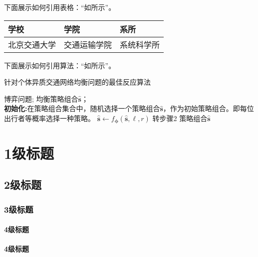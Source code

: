 下面展示如何引用表格：“如所示”。

\begin{bjtutable}
	\begin{tabularx}{\textwidth}{X<{\centering}X<{\centering}X<{\centering}}
		\toprule
		学校&学院&系所\\
		\midrule
		北京交通大学&交通运输学院&系统科学所\\
		\bottomrule
	\end{tabularx}
\end{bjtutable}

下面展示如何引用算法：“如所示”。

\begin{algorithm}[htbp] 
	\caption{针对个体异质交通网络均衡问题的最佳反应算法}
	\label{alg_ptn} 
	\begin{algorithmic}[1]
	 \Require
	 博弈问题; 
	 \Ensure 
	 均衡策略组合$\widehat{\bm{s}}$；\\
	 \textbf{初始化:}在策略组合集合中，随机选择一个策略组合$\widehat{\bm{s}}$，作为初始策略组合。即每位出行者等概率选择一种策略。
	 \State $\widehat{\bm{s}}\leftarrow{}f_{\bm{\phi}}\left(\widehat{\bm{s}},\ell,{r}\right)$
	 \State 转步骤2
	 \EndIf
	 \EndFor
	 \EndFor
	 \State \Return 策略组合$\widehat{\bm{s}}$
	\end{algorithmic} 
   \end{algorithm}

\chapter{1级标题}
\section{2级标题}
\subsection{3级标题}
\subsubsection{4级标题}
\subsubsection{4级标题}
